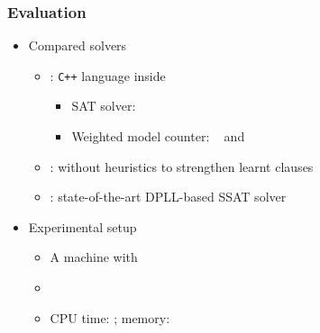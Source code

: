 \renewcommand{\nrandom}{\num{700}}
\renewcommand{\napplication}{\num{212}}
\newcommand{\ntoilet}{\num{77}}
\newcommand{\nmaxcount}{\num{26}}
\newcommand{\nsandcastle}{\num{25}}
\newcommand{\nconformant}{\num{24}}
\newcommand{\nmpec}{\num{60}}

\begin{frame}
    \frametitle{Evaluation}
    \begin{itemize}
        \item Compared solvers
              \begin{itemize}
                  \item \erssat: \texttt{C++} language inside~\abc~\cite{ABC}
                        \begin{itemize}
                            \item SAT solver: ~\cite{Een2003Solver}
                            \item Weighted model counter: \cachet~\cite{Sang2004} and \cudd~\cite{Darwiche2002KnowledgeCompilation}
                        \end{itemize}
                  \item \erssatb: \erssat without heuristics to strengthen learnt clauses
                  \item \dcssat: state-of-the-art DPLL-based SSAT solver
              \end{itemize}
              \pause
        \item Experimental setup
              \begin{itemize}
                  \item A machine with~\machineSpec
                  \item \osInfo
                  \item CPU time: \timelimit; memory: \memlimit
              \end{itemize}
    \end{itemize}
\end{frame}

